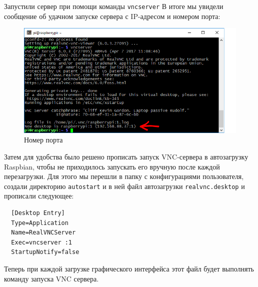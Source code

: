 \documentclass[a4paper,11pt]{article}
\begin{document}
\noindent Запустили сервер при помощи команды \verb|vncserver|
В итоге мы увидели сообщение об удачном запуске сервера с IP-адресом и номером порта:
\begin{figure}[h!]
  \begin{center}
    \includegraphics[scale=0.6]{images/image3.png}
  \caption{Номер порта}
  \end{center}
\end{figure}

\noindent Затем для удобства было решено прописать запуск VNC-сервера в автозагрузку Raspbian, чтобы не приходилось запускать его вручную после каждой перезагрузки.
Для этого мы перешли в папку с конфигурациями пользователя, создали директорию \verb|autostart| и в ней файл автозагрузки \verb|realvnc.desktop| и прописали следующее:
\begin{verbatim}
  [Desktop Entry]
  Type=Application
  Name=RealVNCServer
  Exec=vncserver :1
  StartupNotify=false
\end{verbatim}

\noindent Теперь при каждой загрузке графического интерфейса этот файл будет выполнять команду запуска VNC сервера.
\end{document}
